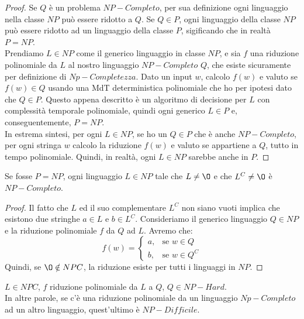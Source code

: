 \begin{proof}
	Se $Q$ è un problema $NP-Completo$, per sua definizione ogni linguaggio nella classe $NP$ può essere ridotto a $Q$. Se $Q \in P$, ogni linguaggio della classe $NP$ può essere ridotto ad un linguaggio della classe $P$, sigificando che in realtà $P = NP$. \\ Prendiamo $L \in NP$ come il generico linguaggio in classe $NP$, e sia $f$ una riduzione polinomiale da $L$ al nostro linguaggio $NP-Completo$ $Q$, che esiste sicuramente per definizione di $Np-Completezza$. Dato un input $w$, calcolo $f(w)$ e valuto se $f(w) \in Q$ usando una MdT deterministica polinomiale che ho per ipotesi dato che $Q \in P$. Questo appena descritto è un algoritmo di decisione per $L$ con complessità temporale polinomiale, quindi ogni generico $L \in P$ e, conseguentemente, $P = NP$. \\
	In estrema sintesi, per ogni $L \in NP$, se ho un $Q \in P$ che è anche $NP-Completo$, per ogni stringa $w$ calcolo la riduzione $f(w)$ e valuto se appartiene a $Q$, tutto in tempo polinomiale. Quindi, in realtà, ogni $L \in NP$ sarebbe anche in $P$.

\end{proof}

\begin{lemm}[Implicazione di P=NP]
	Se fosse $P = NP$, ogni linguaggio $L \in NP$ tale che $L \neq \O$ e che $L^C \neq \O$ è $NP-Completo$.
\end{lemm}

\begin{proof}
	Il fatto che $L$ ed il suo complementare $L^C$ non siano vuoti implica che esistono due stringhe $a \in L$ e $b \in L^C$. Consideriamo il generico linguaggio $Q \in NP$ e la riduzione polinomiale $f$ da $Q$ ad $L$. Avremo che:
	$$
		f(w) = \begin{cases} a, & \mbox{se } w \in Q \\ b, & \mbox{se } w \in Q^C \end{cases}
	$$
	Quindi, se $\O \notin NPC$, la riduzione esiste per tutti i linguaggi in $NP$.
\end{proof}

\begin{lemm}
	$L \in NPC$, $f$ riduzione polinomiale da $L$ a $Q$, $Q \in NP-Hard$. \\
	In altre parole, se c'è una riduzione polinomiale da un linguaggio $Np-Completo$ ad un altro linguaggio, quest'ultimo è $NP-Difficile$.
\end{lemm}

